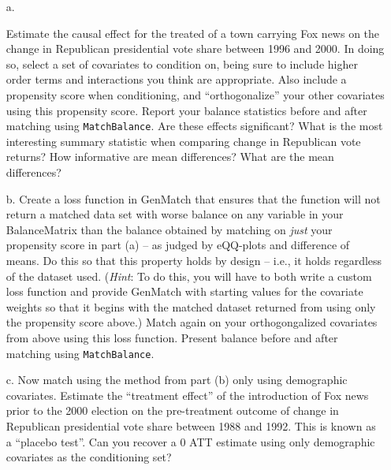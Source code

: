 \documentclass{article}
\begin{document}
\begin{itemize}
\item[a.] 

  Estimate the causal effect for the treated of a town carrying Fox
  news on the change in Republican presidential vote share between
  1996 and 2000.  In doing so, select a set of covariates to condition
  on, being sure to include higher order terms and interactions you
  think are appropriate.  Also include a propensity score when
  conditioning, and ``orthogonalize'' your other covariates using this
  propensity score. Report your balance statistics before and after
  matching using \texttt{MatchBalance}.  Are these effects
  significant?  What is the most interesting summary statistic when
  comparing change in Republican vote returns? How informative are
  mean differences? What are the mean differences?

\item[b.] Create a loss function in GenMatch that ensures that the
  function will not return a matched data set with worse balance on
  any variable in your BalanceMatrix than the balance obtained by
  matching on {\em just} your propensity score in part (a) -- as
  judged by eQQ-plots and difference of means. Do this so that this
  property holds by design -- i.e., it holds regardless of the dataset
  used. ({\em Hint}: To do this, you will have to both write a custom loss
  function and provide GenMatch with starting values for the covariate
  weights so that it begins with the matched dataset returned from
  using only the propensity score above.)  Match again on your
  orthogongalized covariates from above using this loss function.
  Present balance before and after matching using
  \texttt{MatchBalance}.  %

\item[c.] Now match using the method from part (b) only using
  demographic covariates.  Estimate the ``treatment effect'' of the
  introduction of Fox news prior to the 2000 election on the pre-treatment
  outcome of change in Republican presidential vote share between
  1988 and 1992. This is known as a ``placebo test''. Can you recover a
  0 ATT estimate using only demographic covariates as the conditioning
  set?



\end{itemize}
\end{document}
